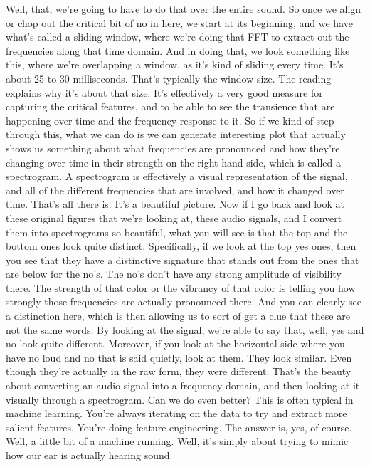 Well, that, we're going to have to do that over the entire sound.
So once we align or chop out the critical bit of no in here,
we start at its beginning, and we have what's
called a sliding window, where we're doing that FFT to extract out
the frequencies along that time domain.
And in doing that, we look something like this,
where we're overlapping a window, as it's kind of sliding every time.
It's about 25 to 30 milliseconds.
That's typically the window size.
The reading explains why it's about that size.
It's effectively a very good measure for capturing the critical features,
and to be able to see the transience that are happening over time
and the frequency response to it.
So if we kind of step through this, what we can do
is we can generate interesting plot that actually shows us something about what
frequencies are pronounced and how they're
changing over time in their strength on the right hand
side, which is called a spectrogram.
A spectrogram is effectively a visual representation of the signal,
and all of the different frequencies that are involved,
and how it changed over time.
That's all there is.
It's a beautiful picture.
Now if I go back and look at these original figures that we're looking at,
these audio signals, and I convert them into spectrograms so beautiful,
what you will see is that the top and the bottom ones look quite distinct.
Specifically, if we look at the top yes ones,
then you see that they have a distinctive signature that stands out
from the ones that are below for the no's.
The no's don't have any strong amplitude of visibility there.
The strength of that color or the vibrancy of that color
is telling you how strongly those frequencies are actually
pronounced there.
And you can clearly see a distinction here,
which is then allowing us to sort of get a clue that these are not
the same words.
By looking at the signal, we're able to say that,
well, yes and no look quite different.
Moreover, if you look at the horizontal side
where you have no loud and no that is said quietly, look at them.
They look similar.
Even though they're actually in the raw form, they were different.
That's the beauty about converting an audio signal into a frequency domain,
and then looking at it visually through a spectrogram.
Can we do even better?
This is often typical in machine learning.
You're always iterating on the data to try and extract more salient features.
You're doing feature engineering.
The answer is, yes, of course.
Well, a little bit of a machine running.
Well, it's simply about trying to mimic how our ear is actually hearing sound.
